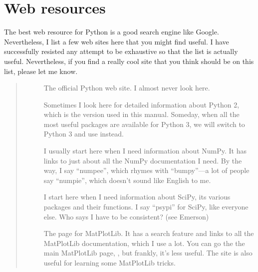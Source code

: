 \documentclass[letterpaper,10pt,english]{sphinxmanual}
\begin{document}
\section{Web resources}
\label{\detokenize{apdx3/apdx3_resources:web-resources}}
\sphinxAtStartPar
The best web resource for Python is a good search engine like Google.  Nevertheless, I list a few web sites here that you might find useful.  I have successfully resisted any attempt to be exhaustive so that the list is actually useful.  Nevertheless, if you find a really cool site that you think should be on this list, please let me know.
\begin{quote}
\begin{description}
\item[{}] \leavevmode
\sphinxAtStartPar
The official Python web site.  I almost never look here.

\item[{}] \leavevmode
\sphinxAtStartPar
Sometimes I look here for detailed information about Python 2, which is the version used in this manual.  Someday, when all the most useful packages are available for Python 3, we will switch to Python 3 and use  instead.

\item[{}] \leavevmode
\sphinxAtStartPar
I usually start here when I need information about NumPy.  It has links to just about all the NumPy documentation I need.  By the way, I say “num\sphinxhyphen{}pee”, which rhymes with “bumpy”—a lot of people say “num\sphinxhyphen{}pie”, which doesn’t sound like English to me.

\item[{}] \leavevmode
\sphinxAtStartPar
I start here when I need information about SciPy, its various packages and their functions.  I say “psy\sphinxhyphen{}pi” for SciPy, like everyone else.  Who says I have to be consistent? (see Emerson)

\item[{}] \leavevmode
\sphinxAtStartPar
The  page for MatPlotLib.  It has a search feature and links to all the MatPlotLib documentation, which I use a lot.  You can go the the main MatPlotLib page, , but frankly, it’s less useful.  The site  is also useful for learning some MatPlotLib tricks.


\end{description}
\end{quote}
\end{document}
